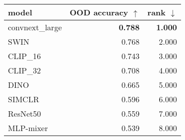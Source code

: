 \begin{tabular}{lrr}
\toprule
          model & OOD accuracy $\uparrow$ & rank $\downarrow$ \\
\midrule
convnext\_large &          \textbf{0.788} &    \textbf{1.000} \\
           SWIN &                   0.768 &             2.000 \\
       CLIP\_16 &                   0.743 &             3.000 \\
       CLIP\_32 &                   0.708 &             4.000 \\
           DINO &                   0.665 &             5.000 \\
         SIMCLR &                   0.596 &             6.000 \\
       ResNet50 &                   0.559 &             7.000 \\
      MLP-mixer &                   0.539 &             8.000 \\
\bottomrule
\end{tabular}

